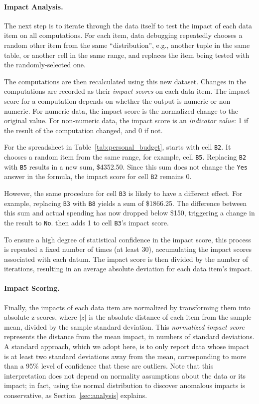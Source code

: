 \paragraph{Impact Analysis.}
The next step is to iterate through the data itself to test the impact
of each data item on all computations. For each item, data debugging
repeatedly chooses a random other item from the same ``distribution'',
e.g., another tuple in the same table, or another cell in the same
range, and replaces the item being tested with the randomly-selected
one.

The computations are then recalculated using this new dataset. Changes
in the computations are recorded as their \emph{impact scores} on each
data item.  The impact score for a computation depends on whether the
output is numeric or non-numeric. For numeric data, the impact score
is the normalized change to the original value.
For non-numeric data, the impact score is an \emph{indicator value}: 1
if the result of the computation changed, and 0 if not.

For the spreadsheet in Table~\ref{tab:personal_budget}, \checkcell{}
starts with cell \texttt{B2}. It chooses a random item from the same
range, for example, cell \texttt{B5}. Replacing \texttt{B2}
with \texttt{B5} results in a new sum, \$4352.50. Since this sum does
not change the \texttt{Yes} answer in the formula, the impact score
for cell \texttt{B2} remains 0.

However, the same procedure for cell \texttt{B3} is likely to have a
different effect.  For example, replacing \texttt{B3}
with \texttt{B8} yields a sum of \$1866.25. The difference
between this sum and actual spending has now dropped below \$150,
triggering a change in the result to \texttt{No}. \checkcell{} then
adds 1 to cell \texttt{B3}'s impact score.


To ensure a high degree of statistical confidence in the impact score,
this process is repeated a fixed number of times (at least 30),
accumulating the impact scores associated with each datum. The impact
score is then divided by the number of iterations, resulting in an
average absolute deviation for each data item's impact.

\paragraph{Impact Scoring.}
Finally, the impacts of each data item are normalized by transforming
them into absolute z-scores, where $|z|$ is the absolute distance of
each item from the sample mean, divided by the sample standard
deviation. This \emph{normalized impact score} represents the distance
from the mean impact, in numbers of standard deviations. A standard
approach, which we adopt here, is to only report data whose impact is
at least two standard deviations away from the mean, corresponding to
more than a 95\% level of confidence that these are outliers.  Note
that this interpretation does not depend on normality assumptions
about the data or its impact; in fact, using the normal distribution
to discover anomalous impacts is conservative, as
Section~\ref{sec:analysis} explains.

